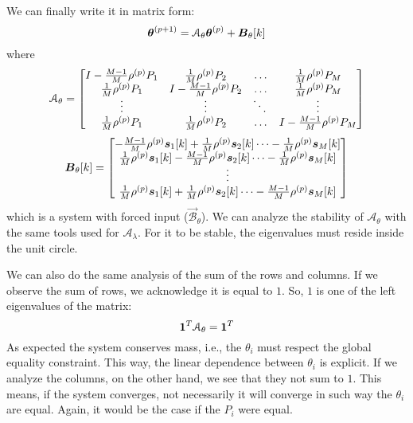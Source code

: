 \documentclass[../main.tex]{subfiles}
\begin{document}
We can finally write it in matrix form:
\begin{equation}
  \label{eq:negotiation_equation_substituting_organizing}
  \boldsymbol{\theta}^{(p+1)}=\mathcal{A}_{\theta}\boldsymbol{\theta}^{(p)}+\mathcal{\boldsymbol{B}}_{\theta}[k]
\end{equation}
where
\begin{equation}
\mathcal{A}_{\theta}=\left[
\begin{matrix}
I-\frac{M-1}{M}\rho\p P_{1} & \frac{1}{M}\rho\p P_{2}&\dots&\frac{1}{M}\rho\p P_{M}\\
\frac{1}{M}\rho\p P_{1}&I-\frac{M-1}{M}\rho\p P_{2}&\dots&\frac{1}{M}\rho\p P_{M}\\
\vdots&\vdots&\ddots&\vdots\\
\frac{1}{M}\rho\p P_{1}&\frac{1}{M}\rho\p P_{2}&\dots&I-\frac{M-1}{M}\rho\p P_{M}\\
\end{matrix}
\right]
\end{equation}
\begin{equation}
\mathcal{\vec{B}}_{\theta}[k]=\left[
\begin{matrix}
-\frac{M-1}{M}\rho\p \vec{s}_{1}[k]+\frac{1}{M}\rho\p \vec{s}_{2}[k]\dots-\frac{1}{M}\rho\p \vec{s}_{M}[k]\\
\frac{1}{M}\rho\p \vec{s}_{1}[k]-\frac{M-1}{M}\rho\p \vec{s}_{2}[k] \dots-\frac{1}{M}\rho\p \vec{s}_{M}[k]\\
\vdots\\
\frac{1}{M}\rho\p \vec{s}_{1}[k]+\frac{1}{M}\rho\p \vec{s}_{2}[k]\dots-\frac{M-1}{M}\rho\p \vec{s}_{M}[k]\\
\end{matrix}
\right]
\end{equation}
which is a \dt{} system with forced input ($\mathcal{\vec{B}}_{\theta}$).
We can analyze the stability of $\mathcal{A}_{\theta}$ with the same tools used for $\mathcal{A}_{\lambda}$.
For it to be stable, the eigenvalues must reside inside the unit circle.

We can also do the same analysis of the sum of the rows and columns.
If we observe the sum of rows, we acknowledge it is equal to $1$.
So, $1$ is one of the left eigenvalues of the matrix:
\begin{equation}
  \label{eq:1}
  \mathbf{1}^{T}\mathcal{A}_{\theta}=\mathbf{1}^{T}
\end{equation}
As expected the system conserves mass, i.e., the $\theta_{i}$ must respect the global equality constraint.
This way, the linear dependence between $\theta_{i}$ is explicit.
If we analyze the columns, on the other hand, we see that they not sum to $1$.
This means, if the system converges, not necessarily it will converge in such way the $\theta_{i}$ are equal.
Again, it would be the case if the $P_{i}$ were equal.
\end{document}
